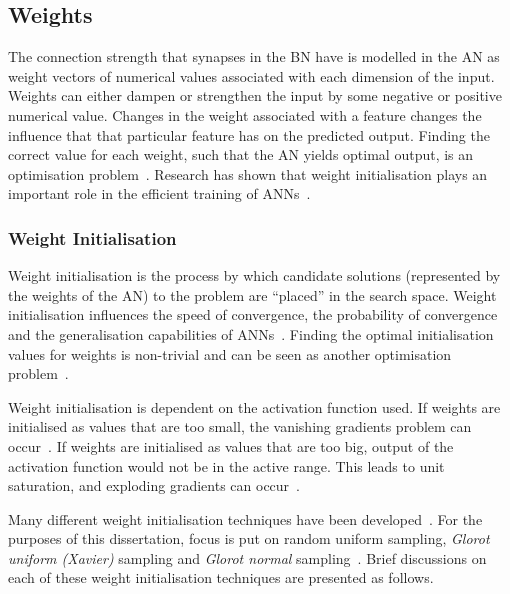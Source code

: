 \subsection{Weights}\label{sec:anns:an:weights}

The connection strength that synapses in the \acs{BN} have is modelled in the \acs{AN} as weight vectors of numerical values associated with each dimension of the input. Weights can either dampen or strengthen the input by some negative or positive numerical value. Changes in the weight associated with a feature changes the influence that that particular feature has on the predicted output. Finding the correct value for each weight, such that the \acs{AN} yields optimal output, is an optimisation problem~\cite{ref:thierens:1993}. Research has shown that weight initialisation plays an important role in the efficient training of \acp{ANN}~\cite{ref:thimm:1995}.

\subsubsection{Weight Initialisation}\label{sec:anns:an:weights:initialisation}

Weight initialisation is the process by which candidate solutions (represented by the weights of the \acs{AN}) to the problem are ``placed'' in the search space. Weight initialisation influences the speed of convergence, the probability of convergence and the generalisation capabilities of \acp{ANN}~\cite{ref:fernandez:2001}. Finding the optimal initialisation values for weights is non-trivial and can be seen as another optimisation problem~\cite{ref:de:2016, ref:erdogmus:2003, ref:yam:2000}.

Weight initialisation is dependent on the activation function used. If weights are initialised as values that are too small, the vanishing gradients problem can occur~\cite{ref:hanin:2018}. If weights are initialised as values that are too big, output of the activation function would not be in the active range. This leads to unit saturation, and exploding gradients can occur~\cite{ref:hanin:2018}.

Many different weight initialisation techniques have been developed~\cite{ref:erdogmus:2003}. For the purposes of this dissertation, focus is put on random uniform sampling, \textit{Glorot uniform (Xavier)} sampling and \textit{Glorot normal} sampling~\cite{ref:glorot:2010}. Brief discussions on each of these weight initialisation techniques are presented as follows.

